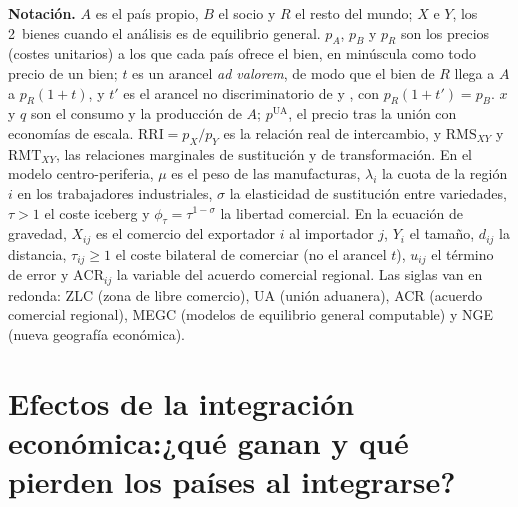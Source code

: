 \documentclass[11pt]{article}
\begin{document}
\begin{anotaciones}
\textbf{Notación.} $A$ es el país propio, $B$ el socio y $R$ el resto del mundo; $X$ e $Y$, los 2~bienes cuando el análisis es de equilibrio general. $p_A$, $p_B$ y $p_R$ son los precios (costes unitarios) a los que cada país ofrece el bien, en minúscula como todo precio de un bien; $t$ es un arancel \emph{ad valorem}, de modo que el bien de $R$ llega a $A$ a $p_R(1+t)$, y $t'$ es el arancel no discriminatorio de  y , con $p_R(1+t')=p_B$. $x$ y $q$ son el consumo y la producción de $A$; $p^{\mathrm{UA}}$, el precio tras la unión con economías de escala. $\mathrm{RRI}=p_X/p_Y$ es la relación real de intercambio, y $\mathrm{RMS}_{XY}$ y $\mathrm{RMT}_{XY}$, las relaciones marginales de sustitución y de transformación. En el modelo centro-periferia, $\mu$ es el peso de las manufacturas, $\lambda_i$ la cuota de la región $i$ en los trabajadores industriales, $\sigma$ la elasticidad de sustitución entre variedades, $\tau>1$ el coste iceberg y $\phi_\tau=\tau^{1-\sigma}$ la libertad comercial. En la ecuación de gravedad, $X_{ij}$ es el comercio del exportador $i$ al importador $j$, $Y_i$ el tamaño, $d_{ij}$ la distancia, $\tau_{ij}\geq 1$ el coste bilateral de comerciar (no el arancel $t$), $u_{ij}$ el término de error y $\mathrm{ACR}_{ij}$ la variable del acuerdo comercial regional. Las siglas van en redonda: ZLC (zona de libre comercio), UA (unión aduanera), ACR (acuerdo comercial regional), MEGC (modelos de equilibrio general computable) y NGE (nueva geografía económica).
\end{anotaciones}

\section{Efectos de la integración económica:\newline ¿qué ganan y qué pierden los países al integrarse?}\label{sec:efectos}
\end{document}
